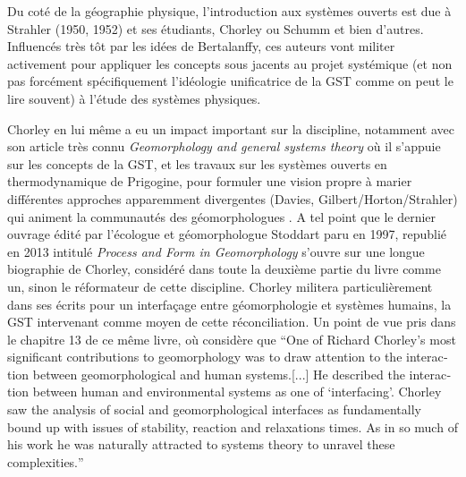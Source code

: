 Du coté de la géographie physique, l'introduction aux systèmes ouverts est due à Strahler (1950, 1952) et ses étudiants, Chorley ou Schumm et bien d'autres. Influencés très tôt par les idées de Bertalanffy, ces auteurs vont militer activement pour appliquer les concepts sous jacents au projet systémique (et non pas forcément spécifiquement l'idéologie unificatrice de la GST comme on peut le lire souvent) à l'étude des systèmes physiques.

Chorley en lui même a eu un impact important sur la discipline, notamment avec son article très connu \textit{Geomorphology and general systems theory} \autocite{Chorley1962} où il s'appuie sur les concepts de la GST, et les travaux sur les systèmes ouverts en thermodynamique de Prigogine, pour formuler une vision propre à marier différentes approches apparemment divergentes (Davies, Gilbert/Horton/Strahler) qui animent la communautés des géomorphologues \autocite{Stoddart2013, Varenne2014}. A tel point que le dernier ouvrage édité par l'écologue et géomorphologue Stoddart paru en 1997, republié en 2013 intitulé \textit{Process and Form in Geomorphology} \autocite{Stoddart2013} s'ouvre sur une longue biographie de Chorley, considéré dans toute la deuxième partie du livre comme un, sinon le réformateur de cette discipline. Chorley militera particulièrement dans ses écrits pour un interfaçage entre géomorphologie et systèmes humains, la GST intervenant comme moyen de cette réconciliation. Un point de vue pris dans le chapitre 13 de ce même livre, où \textcite{Bennett2013} considère que \foreignquote{english}{One of Richard Chorley's most significant contributions to geomorphology was to draw attention to the interaction between geomorphological and human systems.[...] He described the interaction between human and environmental systems as one of \enquote{interfacing}. Chorley saw the analysis of social and geomorphological interfaces as fundamentally bound up with issues of stability, reaction and relaxations times. As in so much of his work he was naturally attracted to systems theory to unravel these complexities.}


